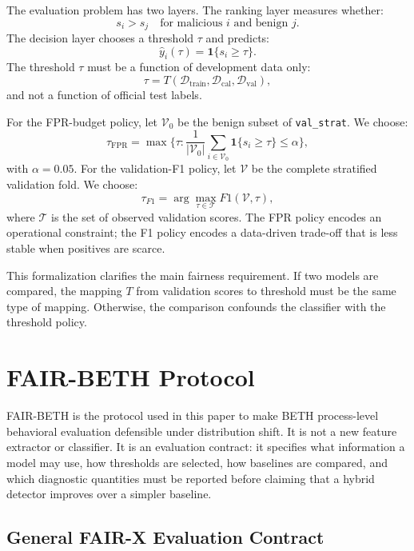 \documentclass[journal]{IEEEtran}
\begin{document}
The evaluation problem has two layers. The ranking layer measures whether:
\[
s_i > s_j \quad \text{for malicious } i \text{ and benign } j.
\]
The decision layer chooses a threshold $\tau$ and predicts:
\[
\hat{y}_i(\tau)=\mathbf{1}\{s_i \geq \tau\}.
\]
The threshold $\tau$ must be a function of development data only:
\[
\tau = T(\mathcal{D}_{\text{train}},\mathcal{D}_{\text{cal}},\mathcal{D}_{\text{val}}),
\]
and not a function of official test labels.

For the FPR-budget policy, let $\mathcal{V}_0$ be the benign subset of \texttt{val\_strat}. We choose:
\[
\tau_{\mathrm{FPR}}=\max\{\tau: \frac{1}{|\mathcal{V}_0|}\sum_{i\in \mathcal{V}_0}\mathbf{1}\{s_i\geq\tau\}\leq \alpha\},
\]
with $\alpha=0.05$. For the validation-F1 policy, let $\mathcal{V}$ be the complete stratified validation fold. We choose:
\[
\tau_{F1}=\arg\max_{\tau \in \mathcal{T}} F1(\mathcal{V},\tau),
\]
where $\mathcal{T}$ is the set of observed validation scores. The FPR policy encodes an operational constraint; the F1 policy encodes a data-driven trade-off that is less stable when positives are scarce.

This formalization clarifies the main fairness requirement. If two models are compared, the mapping $T$ from validation scores to threshold must be the same type of mapping. Otherwise, the comparison confounds the classifier with the threshold policy.

\section{FAIR-BETH Protocol}
\label{sec:fairbeth}

FAIR-BETH is the protocol used in this paper to make BETH process-level behavioral evaluation defensible under distribution shift. It is not a new feature extractor or classifier. It is an evaluation contract: it specifies what information a model may use, how thresholds are selected, how baselines are compared, and which diagnostic quantities must be reported before claiming that a hybrid detector improves over a simpler baseline.

\subsection{General FAIR-X Evaluation Contract}
\label{sec:fairx_contract}
\end{document}
